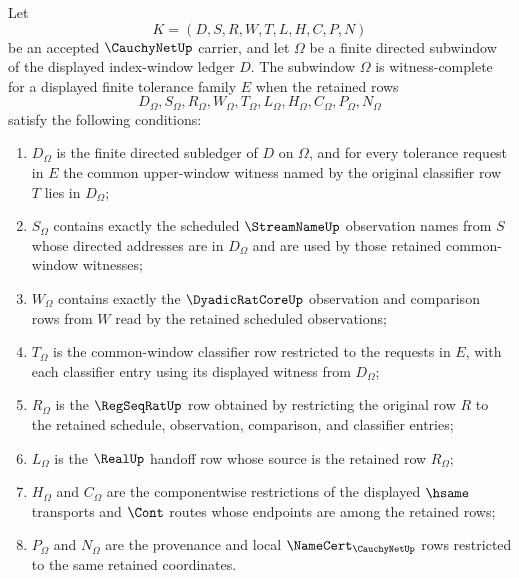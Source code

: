 \begin{definition}
\label{def:cauchy-net-witness-complete-finite-subwindow}
Let
$$
K=(D,S,R,W,T,L,H,C,P,N)
$$
be an accepted $\CauchyNetUp$ carrier, and let $\Omega$ be a finite directed subwindow of the displayed index-window ledger $D$. The subwindow $\Omega$ is witness-complete for a displayed finite tolerance family $E$ when the retained rows
$$
D_{\Omega},S_{\Omega},R_{\Omega},W_{\Omega},T_{\Omega},L_{\Omega},H_{\Omega},C_{\Omega},P_{\Omega},N_{\Omega}
$$
satisfy the following conditions:
\begin{enumerate}
\item $D_{\Omega}$ is the finite directed subledger of $D$ on $\Omega$, and for every tolerance request in $E$ the common upper-window witness named by the original classifier row $T$ lies in $D_{\Omega}$;
\item $S_{\Omega}$ contains exactly the scheduled $\StreamNameUp$ observation names from $S$ whose directed addresses are in $D_{\Omega}$ and are used by those retained common-window witnesses;
\item $W_{\Omega}$ contains exactly the $\DyadicRatCoreUp$ observation and comparison rows from $W$ read by the retained scheduled observations;
\item $T_{\Omega}$ is the common-window classifier row restricted to the requests in $E$, with each classifier entry using its displayed witness from $D_{\Omega}$;
\item $R_{\Omega}$ is the $\RegSeqRatUp$ row obtained by restricting the original row $R$ to the retained schedule, observation, comparison, and classifier entries;
\item $L_{\Omega}$ is the $\RealUp$ handoff row whose source is the retained row $R_{\Omega}$;
\item $H_{\Omega}$ and $C_{\Omega}$ are the componentwise restrictions of the displayed $\hsame$ transports and $\Cont$ routes whose endpoints are among the retained rows;
\item $P_{\Omega}$ and $N_{\Omega}$ are the provenance and local $\NameCert_{\CauchyNetUp}$ rows restricted to the same retained coordinates.
\end{enumerate}
\end{definition}

